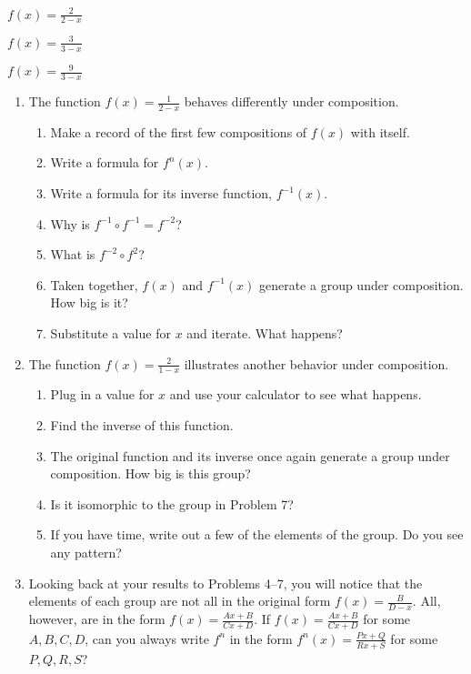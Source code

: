 \documentclass[../textbook.tex]{subfiles}
\begin{document}
\begin{enumerate}
\begin{multicols}{3}
\setcounter{enumi}{\value{problem_i}}
\item \label{prob:compose_start}$f(x)=\frac{2}{2-x}$
\item $f(x)=\frac{3}{3-x}$
\item \label{prob:compose_end}$f(x)=\frac{9}{3-x}$
\setcounter{problem_i}{\value{enumi}}
\end{multicols}
\end{enumerate}
\begin{enumerate}
\setcounter{enumi}{\value{problem_i}}
\item The function $f(x)=\frac{1}{2-x}$ behaves differently under composition.
\begin{enumerate}
\item Make a record of the first few compositions of $f(x)$ with itself.
\item Write a formula for $f^n(x)$.
\item Write a formula for its inverse function, $f^{-1}(x)$.
\item Why is $f^{-1}\circ f^{-1}=f^{-2}$?
\item What is $f^{-2}\circ f^2$?
\item Taken together, $f(x)$ and $f^{-1}(x)$ generate a group under composition. How big is it?
\item Substitute a value for $x$ and iterate. What happens?
\end{enumerate}
\item The function $f(x)=\frac{2}{1-x}$ illustrates another behavior under composition.
\begin{enumerate}
\item Plug in a value for $x$ and use your calculator to see what happens.
\item Find the inverse of this function.
\item The original function and its inverse once again generate a group under composition. How big is this group?
\item Is it isomorphic to the group in Problem 7?
\item If you have time, write out a few of the elements of the group. Do you see any pattern?
\end{enumerate}
\item Looking back at your results to Problems 4--7, you will notice that the elements of each group are not all in the original form $f(x)=\frac{B}{D-x}$. All, however, are in the form $f(x)=\frac{Ax+B}{Cx+D}$. If $f(x)=\frac{Ax+B}{Cx+D}$ for some $A,B,C,D$, can you always write $f^n$ in the form $f^n(x)=\frac{Px+Q}{Rx+S}$ for some $P,Q,R,S$?
\setcounter{problem_i}{\value{enumi}}
\end{enumerate}
\end{document}
